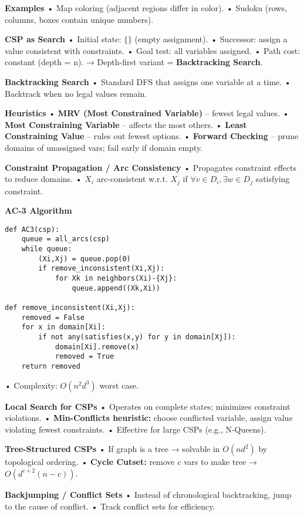 ﻿\documentclass[10pt]{article}
\begin{document}
\begin{multicols*}{2}
\textbf{Examples}  
• Map coloring (adjacent regions differ in color).  
• Sudoku (rows, columns, boxes contain unique numbers).  

\textbf{CSP as Search}  
• Initial state: $\{\}$ (empty assignment).  
• Successor: assign a value consistent with constraints.  
• Goal test: all variables assigned.  
• Path cost: constant (depth = n).  
→ Depth-first variant = \textbf{Backtracking Search}.  

\textbf{Backtracking Search}  
• Standard DFS that assigns one variable at a time.  
• Backtrack when no legal values remain.  

\textbf{Heuristics}  
• \textbf{MRV (Most Constrained Variable)} – fewest legal values.  
• \textbf{Most Constraining Variable} – affects the most others.  
• \textbf{Least Constraining Value} – rules out fewest options.  
• \textbf{Forward Checking} – prune domains of unassigned vars; fail early if domain empty.  

\textbf{Constraint Propagation / Arc Consistency}  
• Propagates constraint effects to reduce domains.  
• $X_i$ arc-consistent w.r.t. $X_j$ if $\forall v \in D_i, \exists w \in D_j$ satisfying constraint.  

\textbf{AC-3 Algorithm}  
\begin{lstlisting}
def AC3(csp):
    queue = all_arcs(csp)
    while queue:
        (Xi,Xj) = queue.pop(0)
        if remove_inconsistent(Xi,Xj):
            for Xk in neighbors(Xi)-{Xj}:
                queue.append((Xk,Xi))

def remove_inconsistent(Xi,Xj):
    removed = False
    for x in domain[Xi]:
        if not any(satisfies(x,y) for y in domain[Xj]):
            domain[Xi].remove(x)
            removed = True
    return removed
\end{lstlisting}

• Complexity: $O(n^2 d^3)$ worst case.  

\textbf{Local Search for CSPs}  
• Operates on complete states; minimizes constraint violations.  
• \textbf{Min-Conflicts heuristic:} choose conflicted variable, assign value violating fewest constraints.  
• Effective for large CSPs (e.g., N-Queens).  

\textbf{Tree-Structured CSPs}  
• If graph is a tree → solvable in $O(nd^2)$ by topological ordering.  
• \textbf{Cycle Cutset:} remove $c$ vars to make tree → $O(d^{c+2}(n-c))$.  

\textbf{Backjumping / Conflict Sets}  
• Instead of chronological backtracking, jump to the cause of conflict.  
• Track conflict sets for efficiency.  


\end{multicols*}
\end{document}
